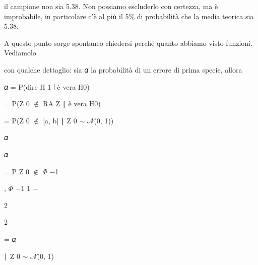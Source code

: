 \documentclass[a4paper,portrait,12pt]{article}
\begin{document}
\begin{flushleft}
il campione non sia 5.38. Non possiamo escluderlo con certezza, ma \`{e} improbabile, in particolare c'\`{e} al più il 5\% di probabilit\`{a} che la media teorica sia 5.38.
\end{flushleft}


\begin{flushleft}
A questo punto sorge spontaneo chiedersi perch\'{e} quanto abbiamo visto funzioni. Vediamolo
\end{flushleft}


\begin{flushleft}
con qualche dettaglio: sia 𝛼 la probabilit\`{a} di un errore di prima specie, allora
\end{flushleft}





\begin{flushleft}
𝛼 = P(dire H 1 ∣ \`{e} vera H0)
\end{flushleft}


\begin{flushleft}
= P(Z 0 $\notin$ RA Z ∣ \`{e} vera H0)
\end{flushleft}


\begin{flushleft}
= P(Z 0 $\notin$ [a, b] ∣ Z 0 $\sim$ 𝒩(0, 1))
\end{flushleft}


\begin{flushleft}
𝛼
\end{flushleft}


\begin{flushleft}
𝛼
\end{flushleft}


\begin{flushleft}
= P Z 0 $\notin$ $\Phi$ $-$1
\end{flushleft}


\begin{flushleft}
, $\Phi$ $-$1 1 $-$
\end{flushleft}


2


2


\begin{flushleft}
= 𝛼
\end{flushleft}





\begin{flushleft}
∣ Z 0 $\sim$ 𝒩(0, 1)
\end{flushleft}
\end{document}
